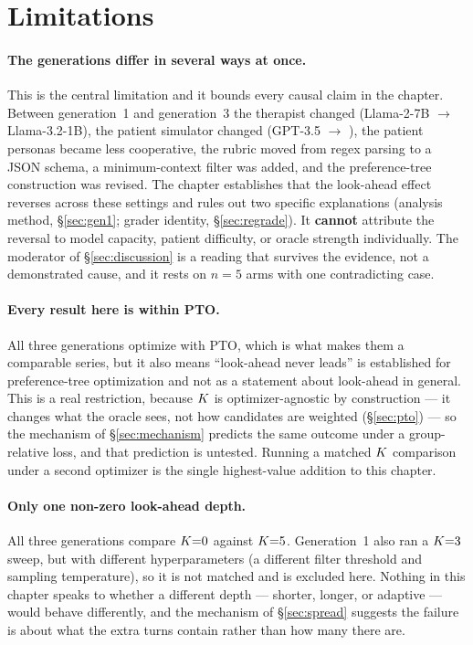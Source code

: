\section{Limitations}
\label{sec:limitations}

\paragraph{The generations differ in several ways at once.}
This is the central limitation and it bounds every causal claim in the chapter. Between
generation~1 and generation~3 the therapist changed (Llama-2-7B $\to$ Llama-3.2-1B), the
patient simulator changed (GPT-3.5 $\to$ \primaryjudge{}), the patient personas became less
cooperative, the rubric moved from regex parsing to a JSON schema, a minimum-context filter was
added, and the preference-tree construction was revised. The chapter establishes that the
look-ahead effect reverses across these settings and rules out two specific explanations
(analysis method, \S\ref{sec:gen1}; grader identity, \S\ref{sec:regrade}). It \textbf{cannot}
attribute the reversal to model capacity, patient difficulty, or oracle strength individually.
The moderator of \S\ref{sec:discussion} is a reading that survives the evidence, not a
demonstrated cause, and it rests on $n = 5$ arms with one contradicting case.

\paragraph{Every result here is within PTO.}
All three generations optimize with PTO, which is what makes them a comparable series, but it
also means ``look-ahead never leads'' is established for preference-tree optimization and not as
a statement about look-ahead in general. This is a real restriction, because $K$ is
optimizer-agnostic by construction --- it changes what the oracle sees, not how candidates are
weighted (\S\ref{sec:pto}) --- so the mechanism of \S\ref{sec:mechanism} predicts the same
outcome under a group-relative loss, and that prediction is untested. Running a matched $K$
comparison under a second optimizer is the single highest-value addition to this chapter.

\paragraph{Only one non-zero look-ahead depth.}
All three generations compare $K{=}0$ against $K{=}5$. Generation~1 also ran a $K{=}3$ sweep,
but with different hyperparameters (a different filter threshold and sampling temperature), so
it is not matched and is excluded here. Nothing in this chapter speaks to whether a different
depth --- shorter, longer, or adaptive --- would behave differently, and the mechanism of
\S\ref{sec:spread} suggests the failure is about what the extra turns contain rather than how
many there are.

